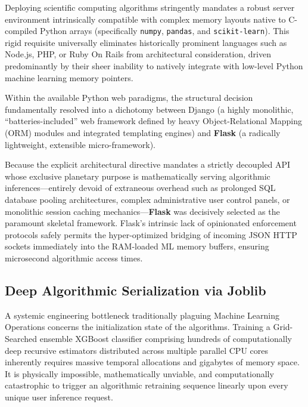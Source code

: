 Deploying scientific computing algorithms stringently mandates a robust
server environment intrinsically compatible with complex memory layouts
native to C-compiled Python arrays (specifically \texttt{numpy},
\texttt{pandas}, and \texttt{scikit-learn}). This rigid requisite
universally eliminates historically prominent languages such as Node.js,
PHP, or Ruby On Rails from architectural consideration, driven
predominantly by their sheer inability to natively integrate with
low-level Python machine learning memory pointers.

Within the available Python web paradigms, the structural decision
fundamentally resolved into a dichotomy between Django (a highly
monolithic, ``batteries-included'' web framework defined by heavy
Object-Relational Mapping (ORM) modules and integrated templating
engines) and \textbf{Flask} (a radically lightweight, extensible
micro-framework).

Because the explicit architectural directive mandates a strictly
decoupled API whose exclusive planetary purpose is mathematically
serving algorithmic inferences---entirely devoid of extraneous overhead
such as prolonged SQL database pooling architectures, complex
administrative user control panels, or monolithic session caching
mechanics---\textbf{Flask} was decisively selected as the paramount
skeletal framework. Flask's intrinsic lack of opinionated enforcement
protocols safely permits the hyper-optimized bridging of incoming JSON
HTTP sockets immediately into the RAM-loaded ML memory buffers, ensuring
microsecond algorithmic access times.

\hypertarget{deep-algorithmic-serialization-via-joblib}{%
\subsection{Deep Algorithmic Serialization via
Joblib}\label{deep-algorithmic-serialization-via-joblib}}

A systemic engineering bottleneck traditionally plaguing Machine
Learning Operations concerns the initialization state of the algorithms.
Training a Grid-Searched ensemble XGBoost classifier comprising hundreds
of computationally deep recursive estimators distributed across multiple
parallel CPU cores inherently requires massive temporal allocations and
gigabytes of memory space. It is physically impossible, mathematically
unviable, and computationally catastrophic to trigger an algorithmic
retraining sequence linearly upon every unique user inference request.

